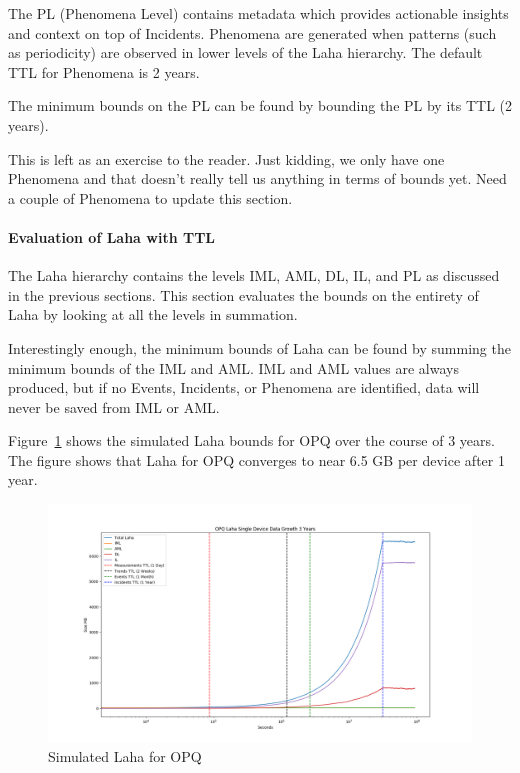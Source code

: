 The PL (Phenomena Level) contains metadata which provides actionable insights and context on top of Incidents. Phenomena are generated when patterns (such as periodicity) are observed in lower levels of the Laha hierarchy. The default TTL for Phenomena is 2 years.

The minimum bounds on the PL can be found by bounding the PL by its TTL (2 years).

This is left as an exercise to the reader. Just kidding, we only have one Phenomena and that doesn't really tell us anything in terms of bounds yet. Need a couple of Phenomena to update this section.

\paragraph{Evaluation of Laha with TTL}

The Laha hierarchy contains the levels IML, AML, DL, IL, and PL as discussed in the previous sections. This section evaluates the bounds on the entirety of Laha by looking at all the levels in summation.

Interestingly enough, the minimum bounds of Laha can be found by summing the minimum bounds of the IML and AML. IML and AML values are always produced, but if no Events, Incidents, or Phenomena are identified, data will never be saved from IML or AML\@.

Figure~\ref{fig:sim_laha_opq} shows the simulated Laha bounds for OPQ over the course of 3 years. The figure shows that Laha for OPQ converges to near 6.5 GB per device after 1 year.

\begin{figure}[H]
	\centering
	\includegraphics[width=\linewidth]{figures/sim_laha_opq.png}
	\caption{Simulated Laha for OPQ}
	\label{fig:sim_laha_opq}
\end{figure}

